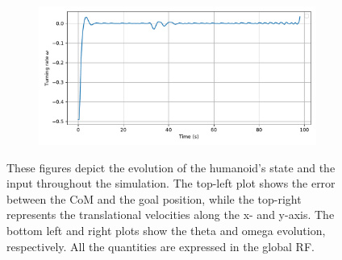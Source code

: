 \begin{figure}[H]
\begin{subfigure}{0.45\linewidth}
    \end{subfigure}
    \begin{subfigure}{0.45\linewidth}
        \centering
        \includegraphics[width=\linewidth]{figures/Simulations/sim1circles/evolution_3.pdf}
    \end{subfigure}
    \caption{These figures depict the evolution of the humanoid's state and the input throughout the simulation. The top-left plot shows the error between the CoM and the goal position, while the top-right represents the translational velocities along the x- and y-axis. The bottom left and right plots show the theta and omega evolution, respectively. All the quantities are expressed in the global RF.}
    \label{fig:sim1_evol}
\end{figure}

